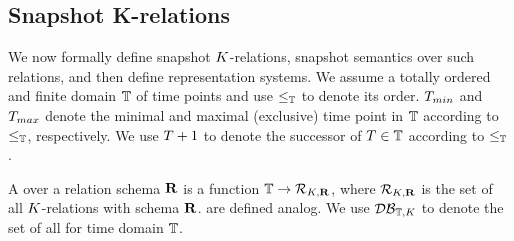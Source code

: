 
\subsection{Snapshot K-relations} %
\label{sec:snapshot-k-relations-1}

We now formally define snapshot
$K$-relations, snapshot semantics over such relations, and then define representation systems.  We assume a totally ordered and finite domain
$\mathbb{T}$ of time points and use $\leq_{\mathbb{T}}$ to denote its order.
$T_{min}$ and $T_{max}$ denote the minimal and maximal (exclusive) time
point in $\mathbb{T}$ according to $\leq_{\mathbb{T}}$, respectively. We use $T + 1$ to denote the successor of %
$T \in \mathbb{T}$ according to %
$\leq_{\mathbb{T}}$.





A \SKrel{} over a relation schema ${\bf R}$ is a function $\mathbb{T} \to \mathcal{R}_{K,{\bf R}}$, where $\mathcal{R}_{K,{\bf R}}$ is the set of all $K$-relations with schema ${\bf R}$. \CapSKdbs{} are defined analog. We use $\mathcal{DB}_{\mathbb{T},K}$ to denote the set of all
\SKdbs{} for time domain $\mathbb{T}$.

